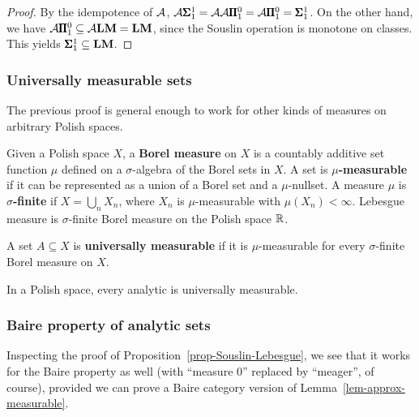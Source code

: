 \begin{corollary}
\end{corollary}\begin{proof}By the idempotence of ${\cal A}$, ${\cal A}\pmb{\Sigma}^{1}_{1} = {\cal A}{\cal
  A}\pmb{\Pi}^0_{1} = {\cal A}\pmb{\Pi}^0_{1} = \pmb{\Sigma}^{1}_{1}$. On the other hand, we have ${\cal A}\pmb{\Pi}^0_{1} \subseteq
{\cal A}\mathbf{LM} = \mathbf{LM}$, since the Souslin operation is monotone on
classes. This yields $\pmb{\Sigma}^{1}_{1} \subseteq \mathbf{LM}$.

\end{proof}\subsubsection{Universally measurable sets}

The previous proof is general enough to work for other kinds of
measures on arbitrary Polish spaces.

Given a Polish space $X$, a \textbf{Borel measure} on $X$ is a
countably additive set function $\mu$ defined on a $\sigma$-algebra of the
Borel sets in $X$. A set is \textbf{$\mu$-measurable} if it can be
represented as a union of a Borel set and a $\mu$-nullset. A measure $\mu$
is \textbf{$\sigma$-finite} if $X = \bigcup_n X_n$, where $X_n$ is
$\mu$-measurable with $\mu(X_n) < \infty$. Lebesgue
measure is $\sigma$-finite Borel measure on the Polish space $\mathbb{R}$.

A set $A \subseteq X$ is \textbf{universally measurable} if it is
$\mu$-measurable for every $\sigma$-finite Borel measure on $X$.

\begin{theorem}[Lusin]\label{thm-analytic-universally-measurable}In a Polish space, every analytic is universally measurable.

\end{theorem}\subsubsection{Baire property of analytic sets}

Inspecting the proof of Proposition~\ref{prop-Souslin-Lebesgue}, we
see that it works for the Baire property as well (with ``measure
0'' replaced by ``meager'', of course), provided we can
prove a Baire category version of Lemma~\ref{lem-approx-measurable}.

